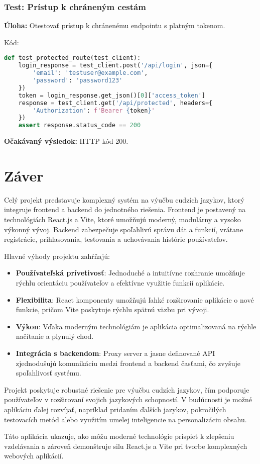\documentclass{article}
\begin{document}
\subsubsection{Test: Prístup k chráneným cestám}
\textbf{Úloha:} Otestovať prístup k chránenému endpointu s platným tokenom.

Kód:
\begin{lstlisting}[language=Python]
def test_protected_route(test_client):
    login_response = test_client.post('/api/login', json={
        'email': 'testuser@example.com',
        'password': 'password123'
    })
    token = login_response.get_json()[0]['access_token']
    response = test_client.get('/api/protected', headers={
        'Authorization': f'Bearer {token}'
    })
    assert response.status_code == 200
\end{lstlisting}
\textbf{Očakávaný výsledok:} HTTP kód 200.

\newpage
\section{Záver}
Celý projekt predstavuje komplexný systém na výučbu cudzích jazykov, ktorý integruje frontend a backend do jednotného riešenia. Frontend je postavený na technológiách React.js a Vite, ktoré umožňujú moderný, modulárny a vysoko výkonný vývoj. Backend zabezpečuje spoľahlivú správu dát a funkcií, vrátane registrácie, prihlasovania, testovania a uchovávania histórie používateľov.

Hlavné výhody projektu zahŕňajú:
\begin{itemize}
    \item \textbf{Používateľská prívetivosť}: Jednoduché a intuitívne rozhranie umožňuje rýchlu orientáciu používateľov a efektívne využitie funkcií aplikácie.
    \item \textbf{Flexibilita}: React komponenty umožňujú ľahké rozširovanie aplikácie o nové funkcie, pričom Vite poskytuje rýchlu spätnú väzbu pri vývoji.
    \item \textbf{Výkon}: Vďaka moderným technológiám je aplikácia optimalizovaná na rýchle načítanie a plynulý chod.
    \item \textbf{Integrácia s backendom}: Proxy server a jasne definované API zjednodušujú komunikáciu medzi frontend a backend časťami, čo zvyšuje spoľahlivosť systému.
\end{itemize}

Projekt poskytuje robustné riešenie pre výučbu cudzích jazykov, čím podporuje používateľov v rozširovaní svojich jazykových schopností. V budúcnosti je možné aplikáciu ďalej rozvíjať, napríklad pridaním ďalších jazykov, pokročilých testovacích metód alebo využitím umelej inteligencie na personalizáciu obsahu.

Táto aplikácia ukazuje, ako môžu moderné technológie prispieť k zlepšeniu vzdelávania a zároveň demonštruje silu React.js a Vite pri tvorbe komplexných webových aplikácií.
\end{document}
